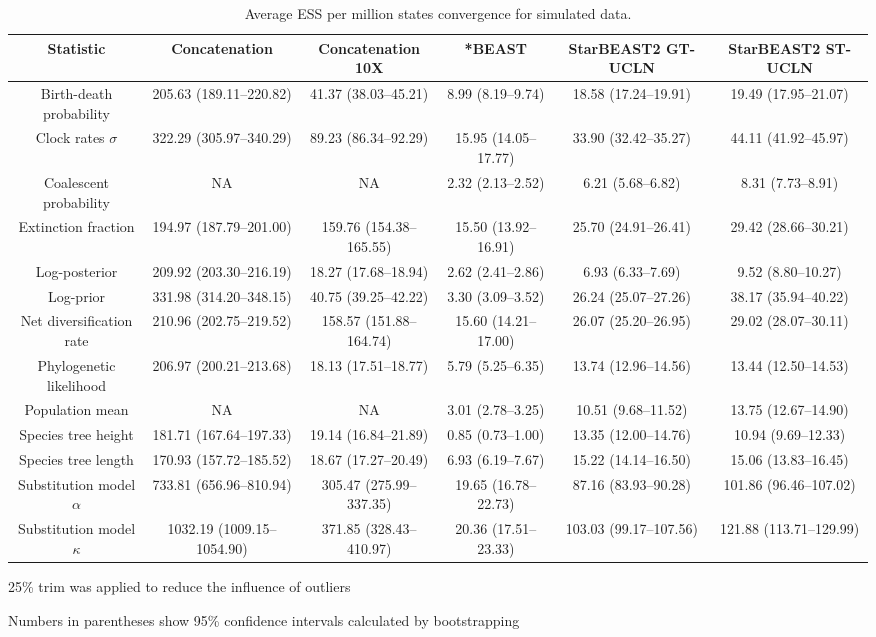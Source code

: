 \documentclass[12pt]{article}
\begin{document}
\begin{landscape}
\clearpage

\begin{table}[htb!]
\centering
\caption{Average ESS per million states convergence for simulated data.}
\label{tab:simulatedPerMstates}
\begin{threeparttable}
\begin{adjustbox}{center}
\renewcommand{\arraystretch}{1.2}
\footnotesize
\begin{tabular}{|c|c|c|c|c|c|}
\multicolumn{1}{c}{Statistic} & \multicolumn{1}{c}{Concatenation} & \multicolumn{1}{c}{Concatenation 10X} & \multicolumn{1}{c}{*BEAST} & \multicolumn{1}{c}{StarBEAST2 GT-UCLN} & \multicolumn{1}{c}{StarBEAST2 ST-UCLN}\tabularnewline
\hline
Birth-death probability & 205.63 (189.11--220.82) & 41.37 (38.03--45.21) & 8.99 (8.19--9.74) & 18.58 (17.24--19.91) & 19.49 (17.95--21.07)\tabularnewline
\hline
Clock rates $\sigma$ & 322.29 (305.97--340.29) & 89.23 (86.34--92.29) & 15.95 (14.05--17.77) & 33.90 (32.42--35.27) & 44.11 (41.92--45.97)\tabularnewline
\hline
Coalescent probability & NA & NA & 2.32 (2.13--2.52) & 6.21 (5.68--6.82) & 8.31 (7.73--8.91)\tabularnewline
\hline
Extinction fraction & 194.97 (187.79--201.00) & 159.76 (154.38--165.55) & 15.50 (13.92--16.91) & 25.70 (24.91--26.41) & 29.42 (28.66--30.21)\tabularnewline
\hline
Log-posterior & 209.92 (203.30--216.19) & 18.27 (17.68--18.94) & 2.62 (2.41--2.86) & 6.93 (6.33--7.69) & 9.52 (8.80--10.27)\tabularnewline
\hline
Log-prior & 331.98 (314.20--348.15) & 40.75 (39.25--42.22) & 3.30 (3.09--3.52) & 26.24 (25.07--27.26) & 38.17 (35.94--40.22)\tabularnewline
\hline
Net diversification rate & 210.96 (202.75--219.52) & 158.57 (151.88--164.74) & 15.60 (14.21--17.00) & 26.07 (25.20--26.95) & 29.02 (28.07--30.11)\tabularnewline
\hline
Phylogenetic likelihood & 206.97 (200.21--213.68) & 18.13 (17.51--18.77) & 5.79 (5.25--6.35) & 13.74 (12.96--14.56) & 13.44 (12.50--14.53)\tabularnewline
\hline
Population mean & NA & NA & 3.01 (2.78--3.25) & 10.51 (9.68--11.52) & 13.75 (12.67--14.90)\tabularnewline
\hline
Species tree height & 181.71 (167.64--197.33) & 19.14 (16.84--21.89) & 0.85 (0.73--1.00) & 13.35 (12.00--14.76) & 10.94 (9.69--12.33)\tabularnewline
\hline
Species tree length & 170.93 (157.72--185.52) & 18.67 (17.27--20.49) & 6.93 (6.19--7.67) & 15.22 (14.14--16.50) & 15.06 (13.83--16.45)\tabularnewline
\hline
Substitution model $\alpha$ & 733.81 (656.96--810.94) & 305.47 (275.99--337.35) & 19.65 (16.78--22.73) & 87.16 (83.93--90.28) & 101.86 (96.46--107.02)\tabularnewline
\hline
Substitution model $\kappa$ & 1032.19 (1009.15--1054.90) & 371.85 (328.43--410.97) & 20.36 (17.51--23.33) & 103.03 (99.17--107.56) & 121.88 (113.71--129.99)\tabularnewline
\hline
\end{tabular}
\end{adjustbox}
\begin{tablenotes}
\footnotesize
\item 25\% trim was applied to reduce the influence of outliers
\item Numbers in parentheses show 95\% confidence intervals calculated by bootstrapping
\end{tablenotes}
\end{threeparttable}
\end{table}

\end{landscape}
\end{document}
